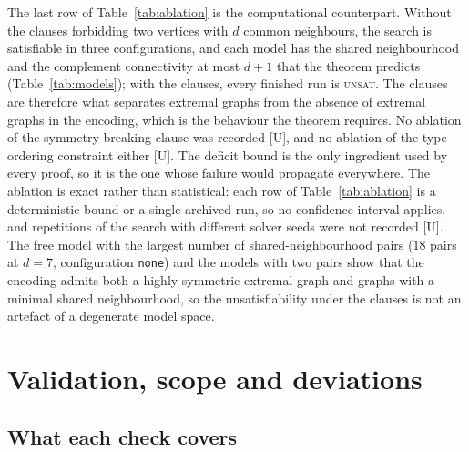 \documentclass[11pt]{article}
\theoremstyle{remark}
\begin{document}
The last row of Table~\ref{tab:ablation} is the computational counterpart. Without the clauses forbidding two vertices with $d$ common neighbours, the search is satisfiable in three configurations, and each model has the shared neighbourhood and the complement connectivity at most $d+1$ that the theorem predicts (Table~\ref{tab:models}); with the clauses, every finished run is \textsc{unsat}. The clauses are therefore what separates extremal graphs from the absence of extremal graphs in the encoding, which is the behaviour the theorem requires. No ablation of the symmetry-breaking clause was recorded [U], and no ablation of the type-ordering constraint either [U]. The deficit bound is the only ingredient used by every proof, so it is the one whose failure would propagate everywhere. The ablation is exact rather than statistical: each row of Table~\ref{tab:ablation} is a deterministic bound or a single archived run, so no confidence interval applies, and repetitions of the search with different solver seeds were not recorded [U]. The free model with the largest number of shared-neighbourhood pairs ($18$ pairs at $d=7$, configuration \texttt{none}) and the models with two pairs show that the encoding admits both a highly symmetric extremal graph and graphs with a minimal shared neighbourhood, so the unsatisfiability under the clauses is not an artefact of a degenerate model space.

\section{Validation, scope and deviations}\label{sec:valid}

\subsection{What each check covers}
\end{document}
